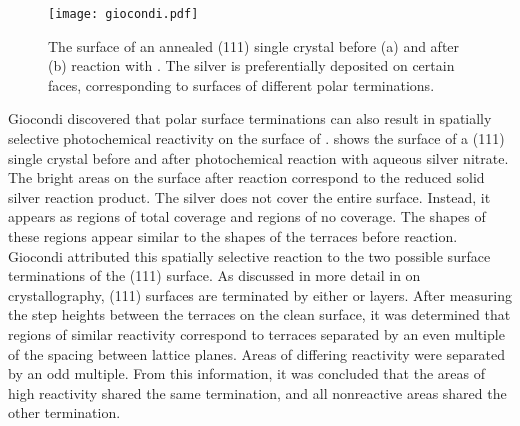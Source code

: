\begin{figure}
\begin{center}
\texttt{[image: giocondi.pdf]}
\caption[Surface of an annealed  (111) single crystal]{%
	The surface of an annealed  (111) single crystal before 
	(a) and after (b) reaction with . The silver is preferentially 
	deposited on certain faces, corresponding to surfaces of different 
	polar terminations.\cite{Giocondi:2003wc}}
\label{fig:giocondi}
\end{center}
\end{figure}
Giocondi\cite{Giocondi:2003wc} discovered that polar surface terminations can also result in spatially selective photochemical reactivity on the surface of .  shows the surface of a (111)  single crystal before and after photochemical reaction with aqueous silver nitrate. The bright areas on the surface after reaction correspond to the reduced solid silver reaction product. The silver does not cover the entire surface. Instead, it appears as regions of total coverage and regions of no coverage. The shapes of these regions appear similar to the shapes of the terraces before reaction. Giocondi attributed this spatially selective reaction to the two possible surface terminations of the (111)  surface. As discussed in more detail in  on  crystallography, (111)  surfaces are terminated by either  or  layers. After measuring the step heights between the terraces on the clean surface, it was determined that regions of similar reactivity correspond to terraces separated by an even multiple of the spacing between lattice planes. Areas of differing reactivity were separated by an odd multiple. From this information, it was concluded that the areas of high reactivity shared the same termination, and all nonreactive areas shared the other termination.

